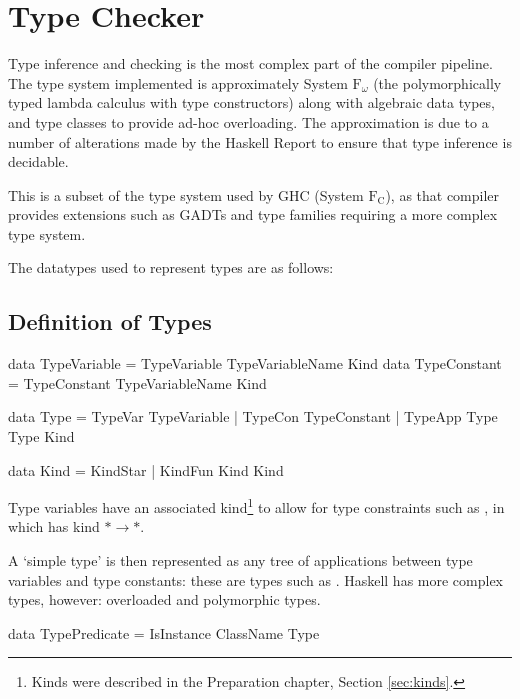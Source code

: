 \documentclass[dissertation.tex]{subfiles}
\begin{document}
\section{Type Checker}
{

    Type inference and checking is the most complex part of the compiler pipeline. The type system implemented is
    approximately System \(\text{F}_\omega\) (the polymorphically typed lambda calculus with type constructors) along
    with algebraic data types, and type classes to provide ad-hoc overloading. The approximation is due to a number of
    alterations made by the Haskell Report to ensure that type inference is decidable.
    
    This is a subset of the type system used by GHC (System \(\text{F}_\text{C}\)), as that compiler provides extensions
    such as GADTs and type families requiring a more complex type system.

    The datatypes used to represent types are as follows:

    \subsection{Definition of Types}
    {

        \begin{haskellfigure}
        data TypeVariable = TypeVariable TypeVariableName Kind
        data TypeConstant = TypeConstant TypeVariableName Kind

        data Type = TypeVar TypeVariable
                    | TypeCon TypeConstant
                    | TypeApp Type Type Kind

        data Kind = KindStar
                    | KindFun Kind Kind
        \end{haskellfigure}

        Type variables have an associated kind\footnote{Kinds were described in the Preparation chapter, Section
        \ref{sec:kinds}.} to allow for type constraints such as , in which  has kind \(*\rightarrow*\).

        A `simple type' is then represented as any tree of applications between type variables and type constants: these
        are types such as . Haskell has more complex types, however: overloaded and
        polymorphic types.

        \begin{haskellfigure}
        data TypePredicate = IsInstance ClassName Type


\end{haskellfigure}}}
\end{document}
